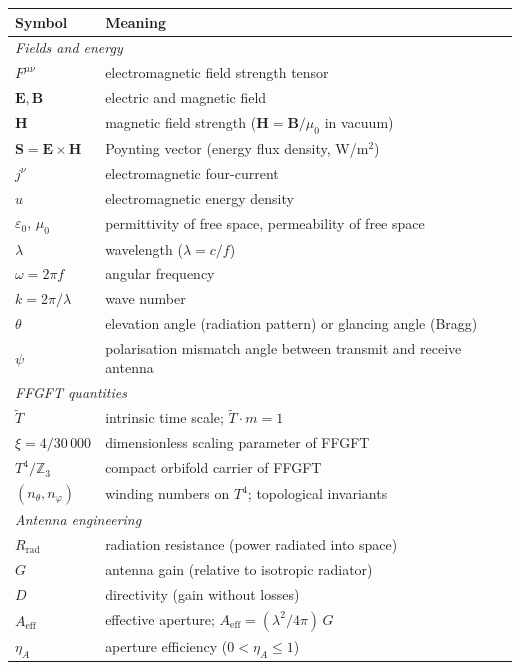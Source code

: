 \medskip
\begin{longtable}{@{}lp{7cm}@{}}
\toprule
\textbf{Symbol} & \textbf{Meaning} \\
\midrule
\multicolumn{2}{l}{\textit{Fields and energy}} \\
$F^{\mu\nu}$ & electromagnetic field strength tensor \\
$\mathbf{E}, \mathbf{B}$ & electric and magnetic field \\
$\mathbf{H}$ & magnetic field strength ($\mathbf{H} = \mathbf{B}/\mu_0$ in vacuum) \\
$\mathbf{S} = \mathbf{E}\times\mathbf{H}$ & Poynting vector (energy flux density, W/m$^2$) \\
$j^\nu$ & electromagnetic four-current \\
$u$ & electromagnetic energy density \\
$\varepsilon_0,\,\mu_0$ & permittivity of free space, permeability of free space \\
$\lambda$ & wavelength ($\lambda = c/f$) \\
$\omega = 2\pi f$ & angular frequency \\
$k = 2\pi/\lambda$ & wave number \\
$\theta$ & elevation angle (radiation pattern) or glancing angle (Bragg) \\
$\psi$ & polarisation mismatch angle between transmit and receive antenna \\
\midrule
\multicolumn{2}{l}{\textit{FFGFT quantities}} \\
$\tilde{T}$ & intrinsic time scale; $\tilde{T} \cdot m = 1$ \\
$\xi = 4/30\,000$ & dimensionless scaling parameter of FFGFT \\
$T^4/\mathbb{Z}_3$ & compact orbifold carrier of FFGFT \\
$(n_\theta, n_\varphi)$ & winding numbers on $T^4$; topological invariants \\
\midrule
\multicolumn{2}{l}{\textit{Antenna engineering}} \\
$R_\mathrm{rad}$ & radiation resistance (power radiated into space) \\
$G$ & antenna gain (relative to isotropic radiator) \\
$D$ & directivity (gain without losses) \\
$A_\mathrm{eff}$ & effective aperture; $A_\mathrm{eff} = (\lambda^2/4\pi)\,G$ \\
$\eta_A$ & aperture efficiency ($0 < \eta_A \leq 1$) \\

\end{longtable}
